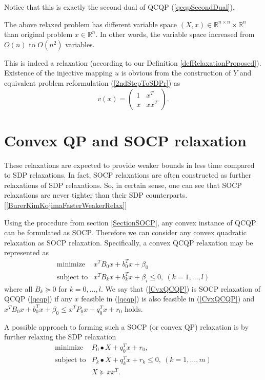 \documentclass[12pt]{book}
\theoremstyle{definition}
\begin{document}
\rem Notice that this is exactly the second dual of QCQP (\ref{qcqpSecondDual}).




The above relaxed problem has different variable space $(X,x)\in \mathbb{R}^{n\times n}\times \mathbb{R}^n$ than original problem $x\in \mathbb{R}^n$. 
In other words, the variable space increased from $O(n)$ to $O(n^2)$ variables.

\rem This is indeed a relaxation (according to our Definition \ref{defRelaxationProposed}). Existence of the injective mapping $u$ is obvious from the construction of $Y$ and equivalent problem reformulation (\ref{2ndStepToSDPr}) as 
$$v(x)=\left(
\begin{array}{cc}
1 & x^T\\
x & xx^T
\end{array}\right).
$$

\section{Convex QP and SOCP relaxation}
\label{SectionSOCPrelaxation}

These relaxations are expected to provide weaker bounds in less time compared to SDP relaxations. In fact, SOCP relaxations are often constructed as further relaxations of SDP relaxations. So, in certain sense, one can see that SOCP relaxations are never tighter than their SDP counterparts. [\ref{BurerKimKojimaFasterWeakerRelax}]

Using the procedure from section \ref{SectionSOCP}, any convex instance of QCQP can be formulated as SOCP. Therefore we can consider any convex quadratic relaxation as SOCP relaxation. 
Specifically, a convex QCQP relaxation may be represented as 
\begin{equation}
\label{CvxQCQP} 
\begin{array}{ll}
\mbox{minimize}& x^TB_0x + b_0^Tx + \beta_0\\
\mbox{subject to}& x^TB_kx + b_k^Tx + \beta_i \leq 0, \  (k = 1,\dots ,l)
\end{array} 
\end{equation}
where all $B_k\succeq 0$ for $k=0,\dots ,l$. We say that (\ref{CvxQCQP}) is SOCP relaxation of QCQP (\ref{qcqp}) if any $x$ feasible in (\ref{qcqp}) is also feasible in (\ref{CvxQCQP}) and $x^TB_0x+b_0^Tx + \beta_0 \leq x^TP_0x+q_0^Tx+r_0$ holds.

A possible approach to forming such a SOCP (or convex QP) relaxation is by further relaxing the SDP relaxation 
\begin{equation}
\label{SDPRelaxSOCPsection}
\begin{array}{ll}
\mbox{minimize}& P_0\bullet X + q_0^Tx + r_0,\\
\mbox{subject to}& P_k\bullet X+ q_k^Tx + r_k \leq 0, \  (k = 1,\dots ,m)\\
& X\succeq xx^T.
\end{array} 
\end{equation}
\end{document}

